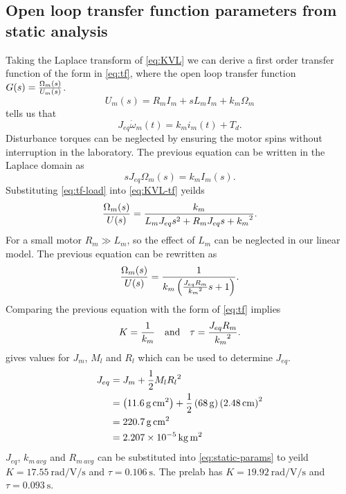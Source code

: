 \subsection{Open loop transfer function parameters from static analysis}\label{sec:tf-static}
Taking the Laplace transform of \eqref{eq:KVL} we can derive a first order transfer function of the form in \eqref{eq:tf}, where the open loop transfer function $G(s) = {\Omega_m(s) \over U_m(s)}$.
\begin{equation}\label{eq:KVL-tf}
  U_m(s) = R_m I_m + s L_m I_m + k_m \Omega_m
\end{equation}
\cite{lab-manual} tells us that
\begin{equation*}
  J_{eq} \dot{\omega}_m(t) = k_m i_m(t) + T_d.
\end{equation*}
Disturbance torques can be neglected by ensuring the motor spins without interruption in the laboratory.
The previous equation can be written in the Laplace domain as
\begin{equation}\label{eq:tf-load}
  sJ_{eq} \Omega_m(s) = k_m I_m(s).
\end{equation}
Substituting \eqref{eq:tf-load} into \eqref{eq:KVL-tf} yeilds
\begin{equation*}
  {\Omega_m(s) \over U(s)} = {k_m \over L_m J_{eq}s^2 + R_m J_{eq} s + {k_m}^2}.
\end{equation*}
For a small motor $R_m \gg L_m$, so the effect of $L_m$ can be neglected in our linear model.
The previous equation can be rewritten as
\begin{equation*}
  {\Omega_m(s) \over U(s)} = { 1 \over k_m \left( {J_{eq} R_m \over {k_m}^2} s + 1 \right)}.
\end{equation*}
Comparing the previous equation with the form of \eqref{eq:tf} implies
\begin{equation}\label{eq:static-params}
  K = {1 \over k_m} \quad \text{and} \quad \tau = {J_{eq} R_m \over {k_m}^2}.
\end{equation}
\cite{lab-manual} gives values for $J_m$, $M_l$ and $R_l$ which can be used to determine $J_{eq}$.
\begin{align*}
  J_{eq} &= J_m + {1 \over 2} M_l {R_l}^2 \\
         &= \left(\SI{11.6}{\gram\square\centi\meter}\right) + {1 \over 2} \left(\SI{68}{\gram}\right) \left(\SI{2.48}{\centi\meter}\right)^2 \\
         &= \SI{220.7}{\gram\square\centi\meter} \\
         &= \SI{2.207e-5}{\kilogram\square\meter}
\end{align*}
$J_{eq}$, $k_{m\>avg}$ and $R_{m\>avg}$ can be substituted into \eqref{eq:static-params} to yeild $K = \SI{17.55}{\radian\per\volt\per\second}$ and $\tau = \SI{0.106}{\second}$.
The prelab has $K = \SI{19.92}{\radian\per\volt\per\second}$ and $\tau = \SI{0.093}{\second}$.

